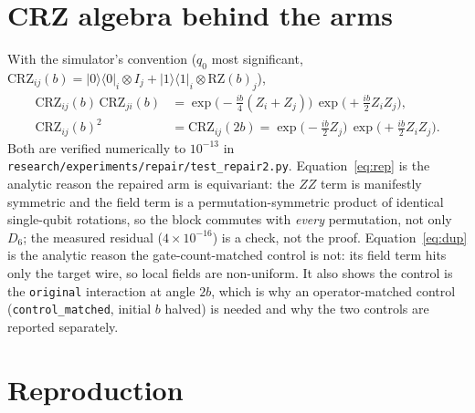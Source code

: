 \documentclass[11pt]{article}
\begin{document}
\appendix

\section{CRZ algebra behind the arms}
\label{app:crz}

With the simulator's convention ($q_0$ most significant,
$\mathrm{CRZ}_{ij}(b)=\lvert0\rangle\langle0\rvert_i\otimes I_j +
\lvert1\rangle\langle1\rvert_i\otimes\mathrm{RZ}(b)_j$),
\begin{align}
 \mathrm{CRZ}_{ij}(b)\,\mathrm{CRZ}_{ji}(b)
   &= \exp\!\bigl(-\tfrac{i b}{4}(Z_i+Z_j)\bigr)\,
      \exp\!\bigl(+\tfrac{i b}{2}Z_iZ_j\bigr), \label{eq:rep}\\
 \mathrm{CRZ}_{ij}(b)^2 &= \mathrm{CRZ}_{ij}(2b)
   = \exp\!\bigl(-\tfrac{i b}{2}Z_j\bigr)\,
     \exp\!\bigl(+\tfrac{i b}{2}Z_iZ_j\bigr). \label{eq:dup}
\end{align}
Both are verified numerically to $10^{-13}$ in
\texttt{research/experiments/repair/test\_repair2.py}. Equation~\eqref{eq:rep} is the
analytic reason the repaired arm is equivariant: the $ZZ$ term is manifestly symmetric and
the field term is a permutation-symmetric product of identical single-qubit rotations, so
the block commutes with \emph{every} permutation, not only $D_6$; the measured residual
($4\times10^{-16}$) is a check, not the proof. Equation~\eqref{eq:dup} is the analytic
reason the gate-count-matched control is not: its field term hits only the target wire, so
local fields are non-uniform. It also shows the control is the \texttt{original}
interaction at angle $2b$, which is why an operator-matched control
(\texttt{control\_matched}, initial $b$ halved) is needed and why the two controls are
reported separately.

\section{Reproduction}
\label{app:repro}
\end{document}
